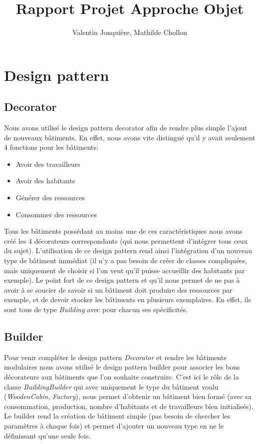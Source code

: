 \documentclass{article}
\author{
    Valentin Jonquière,
    Mathilde Chollon
}
\title{Rapport Projet Approche Objet}
\begin{document}
\maketitle

\pagebreak

\tableofcontents

\pagebreak

\section{Design pattern}
\subsection{Decorator}
Nous avons utilisé le design pattern decorator afin de rendre plus simple l'ajout de nouveaux bâtiments.
En effet, nous avons vite distingué qu'il y avait seulement 4 fonctions pour les bâtiments:
\begin{itemize}
    \item Avoir des travailleurs
    \item Avoir des habitants
    \item Générer des ressources
    \item Consommer des ressources
\end{itemize}
Tous les bâtiments possédant au moins une de ces caractéristiques nous avons créé les 4 décorateurs correspondants
(qui nous permettent d'intégrer tous ceux du sujet). L'utilisation de ce design pattern rend ainsi l'intégration
d'un nouveau type de bâtiment immédiat (il n'y a pas besoin de créer de classes compliquées, mais uniquement de choisir
si l'on veut qu'il puisse accueillir des habitants par exemple). Le point fort de ce design pattern et qu'il nous permet
de ne pas à avoir à se soucier de savoir si un bâtiment doit produire des ressources par exemple, et de devoir stocker les
bâtiments en plusieurs exemplaires. En effet, ils sont tous de type \textit{Building} avec pour chacun ses spécificités.

\subsection{Builder}
Pour venir compléter le design pattern \textit{Decorator} et rendre les bâtiments modulaires nous avons utilisé le design
pattern builder pour associer les bons décorateurs aux bâtiments que l'on souhaite construire. C'est ici le rôle de la
classe \textit{BuildingBuilder} qui avec uniquement le type du bâtiment voulu (\textit{WoodenCabin}, \textit{Factory}), 
nous permet d'obtenir un bâtiment bien formé (avec sa consommation, production, nombre d'habitants et de travailleurs bien 
initialisés). Le builder rend la création de bâtiment simple (pas besoin de chercher les paramètres à chaque fois) et permet 
d'ajouter un nouveau type en ne le définissant qu'une seule fois.
\end{document}
